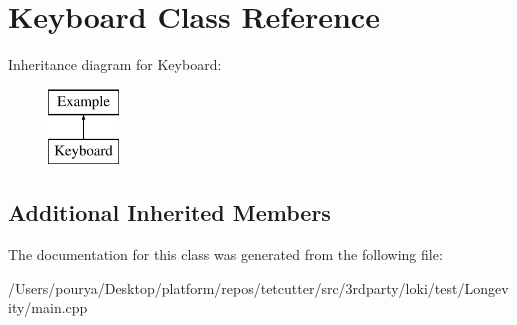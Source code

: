 \hypertarget{classKeyboard}{}\section{Keyboard Class Reference}
\label{classKeyboard}
Inheritance diagram for Keyboard\+:\begin{figure}[H]
\begin{center}
\leavevmode
\includegraphics[height=2.000000cm]{classKeyboard}
\end{center}
\end{figure}
\subsection*{Additional Inherited Members}


The documentation for this class was generated from the following file\+:\begin{DoxyCompactItemize}
\item 
/\+Users/pourya/\+Desktop/platform/repos/tetcutter/src/3rdparty/loki/test/\+Longevity/main.\+cpp\end{DoxyCompactItemize}
